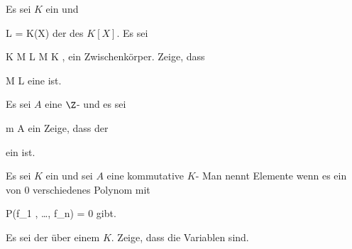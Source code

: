 {}
{





Es sei $K$ ein
 und

\mavergleichskette
{\vergleichskette
{ L
}
{ = }{ K(X)
}
{  }{
}
{    }{
}
{   }{
}
}
{}{}{}
der
des
$K[X]$. Es sei

 {}
 {K \subseteq M \subseteq L} {}
 {M \neq K} {} {} {,}
ein Zwischenkörper. Zeige, dass

\mavergleichskette
{\vergleichskette
{ M
}
{ \subseteq }{ L
}
{  }{
}
{    }{
}
{   }{
}
}
{}{}{}
eine
ist.





}
{} {}

{}
{





Es sei $A$ eine
$\Z$-
und es sei

\mavergleichskette
{\vergleichskette
{ {\mathfrak m}
}
{ \subseteq }{ A
}
{  }{
}
{    }{
}
{   }{
}
}
{}{}{}
ein
Zeige, dass der

 ein
ist.





}
{} {}







Es sei $K$ ein
 und sei $A$ eine kommutative
$K$-
Man nennt Elemente
wenn es ein von $0$ verschiedenes Polynom
 mit

\mavergleichskettedisp
{\vergleichskette
{P(f_1 , \ldots , f_n)
}
{ =} { 0
}
{ } {
}
{ } {
}
{ } {
}
}
{}{}{}
gibt.







{}
{





Es sei
 der
über einem
$K$. Zeige, dass die Variablen
sind.





}
{} {}

